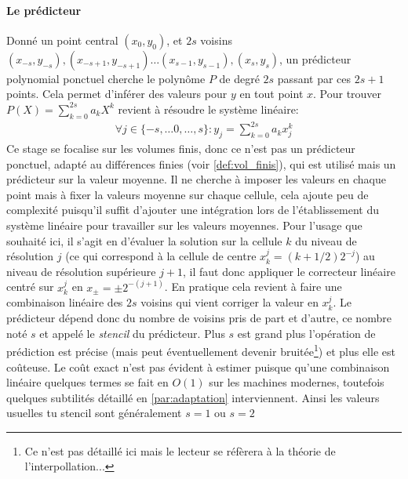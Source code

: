         \paragraph{Le prédicteur}
            Donné un point central $(x_0,y_0)$, et $2s$ voisins $(x_{-s},y_{-s}),(x_{-s+1},y_{-s+1})\dots (x_{s-1},y_{s-1}),(x_s,y_s)$, un prédicteur polynomial 
            ponctuel cherche le polynôme $P$ de degré $2s$ passant par ces $2s+1$ points. Cela permet d'inférer des valeurs pour $y$ en tout point $x$.
            Pour trouver $P(X) = \sum_{k=0}^{2s} a_k X^k$ revient à résoudre le système linéaire:
            \begin{align}
                \forall j \in \{-s,\dots 0 ,\dots,s\}: y_j = \sum_{k=0}^{2s} a_k x_j^k
            \end{align}
            Ce stage se focalise sur les volumes finis, donc ce n'est pas un prédicteur ponctuel, adapté au différences finies (voir \ref{def:vol_finis}), qui est utilisé mais un prédicteur sur la valeur moyenne. 
            Il ne cherche à imposer les valeurs en chaque point mais à fixer la valeurs moyenne sur chaque cellule,
            cela ajoute peu de complexité puisqu'il suffit d'ajouter une intégration lors de l'établissement du système linéaire pour travailler sur les valeurs moyennes.
            Pour l'usage que souhaité ici, il s'agit en d'évaluer la solution sur la cellule $k$ du niveau de résolution $j$ 
            (ce qui correspond à la cellule de centre $x_k^j = (k+1/2) 2^{-j}$) au niveau de résolution supérieure $j+1$,
            il faut donc appliquer le correcteur linéaire centré sur $x_k^j$ en $x_{\pm} = \pm 2^{-(j+1)}$. En pratique cela revient à faire une combinaison linéaire des $2s$ voisins
            qui vient corriger la valeur en $x_k^j$.
            Le prédicteur dépend donc du nombre de voisins pris de part et d'autre, ce nombre noté $s$ et appelé le \textit{stencil} du prédicteur.
            Plus $s$ est grand plus l'opération de prédiction est précise (mais peut éventuellement devenir bruitée\footnote{Ce n'est pas détaillé ici mais le lecteur se réfèrera à la théorie de l'interpollation...})
            et plus elle est coûteuse. Le coût exact n'est pas évident à estimer puisque qu'une combinaison linéaire
            quelques termes se fait en $O(1)$ sur les machines modernes, toutefois quelques subtilités détaillé en \ref{par:adaptation} interviennent.
            Ainsi les valeurs usuelles tu stencil sont généralement $s=1$ ou $s=2$

